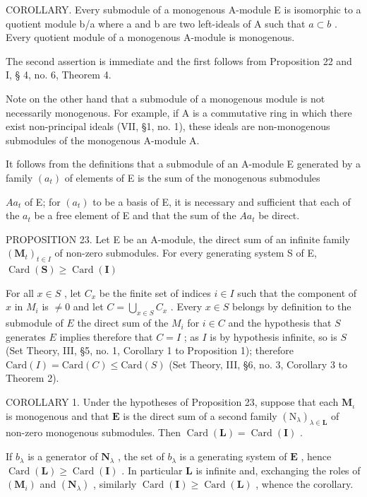 COROLLARY. Every submodule of a monogenous A-module E is isomorphic to a quotient module b/a where a and b are two left-ideals of A such that \(a \subset b\) . Every quotient module of a monogenous A-module is monogenous.

The second assertion is immediate and the first follows from Proposition 22 and I, § 4, no. 6, Theorem 4.

Note on the other hand that a submodule of a monogenous module is not necessarily monogenous. For example, if A is a commutative ring in which there exist non-principal ideals (VII, §1, no. 1), these ideals are non-monogenous submodules of the monogenous A-module A.

It follows from the definitions that a submodule of an A-module E generated by a family \((a_{t})\) of elements of E is the sum of the monogenous submodules

\(Aa_{t}\) of E; for \((a_{t})\) to be a basis of E, it is necessary and sufficient that each of the \(a_{t}\) be a free element of E and that the sum of the \(Aa_{t}\) be direct.

PROPOSITION 23. Let E be an A-module, the direct sum of an infinite family \((\mathbf{M}_t)_{t\in I}\) of non-zero submodules. For every generating system S of E, \(\operatorname{Card}(\mathbf{S})\geqslant \operatorname{Card}(\mathbf{I})\)

For all \(x \in S\) , let \(C_x\) be the finite set of indices \(i \in I\) such that the component of \(x\) in \(M_i\) is \(\neq 0\) and let \(C = \bigcup_{x \in S} C_x\) . Every \(x \in S\) belongs by definition to the submodule of \(E\) the direct sum of the \(M_i\) for \(i \in C\) and the hypothesis that \(S\) generates \(E\) implies therefore that \(C = I\) ; as \(I\) is by hypothesis infinite, so is \(S\) (Set Theory, III, §5, no. 1, Corollary 1 to Proposition 1); therefore \(\text{Card}(I) = \text{Card}(C) \leqslant \text{Card}(S)\) (Set Theory, III, §6, no. 3, Corollary 3 to Theorem 2).

COROLLARY 1. Under the hypotheses of Proposition 23, suppose that each \(\mathbf{M}_{\iota}\) is monogenous and that \(\mathbf{E}\) is the direct sum of a second family \((\mathrm{N}_{\lambda})_{\lambda \in \mathbf{L}}\) of non-zero monogenous submodules. Then \(\operatorname{Card}(\mathbf{L}) = \operatorname{Card}(\mathbf{I})\) .

If \(b_{\lambda}\) is a generator of \(\mathbf{N}_{\lambda}\) , the set of \(b_{\lambda}\) is a generating system of \(\mathbf{E}\) , hence \(\operatorname{Card}(\mathbf{L}) \geqslant \operatorname{Card}(\mathbf{I})\) . In particular \(\mathbf{L}\) is infinite and, exchanging the roles of \((\mathbf{M}_i)\) and \((\mathbf{N}_{\lambda})\) , similarly \(\operatorname{Card}(\mathbf{I}) \geqslant \operatorname{Card}(\mathbf{L})\) , whence the corollary.

